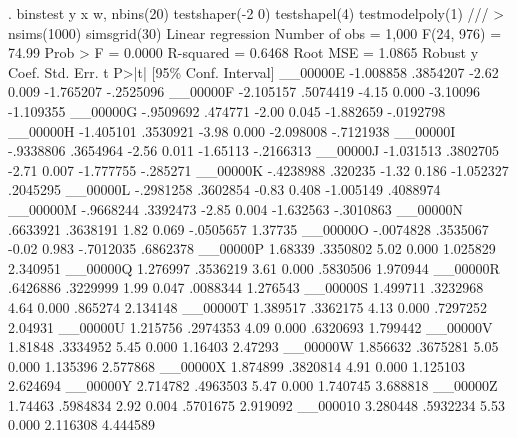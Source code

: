 . binstest y x w, nbins(20) testshaper(-2 0) testshapel(4) testmodelpoly(1) ///
>                    nsims(1000) simsgrid(30)
{\smallskip}
Linear regression                               Number of obs     =      1,000
                                                F(24, 976)        =      74.99
                                                Prob > F          =     0.0000
                                                R-squared         =     0.6468
                                                Root MSE          =     1.0865
{\smallskip}
             {\VBAR}               Robust
           y {\VBAR}      Coef.   Std. Err.      t    P>|t|     [95\% Conf. Interval]
    __00000E {\VBAR}  -1.008858   .3854207    -2.62   0.009    -1.765207   -.2525096
    __00000F {\VBAR}  -2.105157   .5074419    -4.15   0.000     -3.10096   -1.109355
    __00000G {\VBAR}  -.9509692    .474771    -2.00   0.045    -1.882659   -.0192798
    __00000H {\VBAR}  -1.405101   .3530921    -3.98   0.000    -2.098008   -.7121938
    __00000I {\VBAR}  -.9338806   .3654964    -2.56   0.011     -1.65113   -.2166313
    __00000J {\VBAR}  -1.031513   .3802705    -2.71   0.007    -1.777755    -.285271
    __00000K {\VBAR}  -.4238988    .320235    -1.32   0.186    -1.052327    .2045295
    __00000L {\VBAR}  -.2981258   .3602854    -0.83   0.408    -1.005149    .4088974
    __00000M {\VBAR}  -.9668244   .3392473    -2.85   0.004    -1.632563   -.3010863
    __00000N {\VBAR}   .6633921   .3638191     1.82   0.069    -.0505657     1.37735
    __00000O {\VBAR}  -.0074828   .3535067    -0.02   0.983    -.7012035    .6862378
    __00000P {\VBAR}    1.68339   .3350802     5.02   0.000     1.025829    2.340951
    __00000Q {\VBAR}   1.276997   .3536219     3.61   0.000     .5830506    1.970944
    __00000R {\VBAR}   .6426886   .3229999     1.99   0.047     .0088344    1.276543
    __00000S {\VBAR}   1.499711   .3232968     4.64   0.000      .865274    2.134148
    __00000T {\VBAR}   1.389517   .3362175     4.13   0.000     .7297252     2.04931
    __00000U {\VBAR}   1.215756   .2974353     4.09   0.000     .6320693    1.799442
    __00000V {\VBAR}    1.81848   .3334952     5.45   0.000      1.16403     2.47293
    __00000W {\VBAR}   1.856632   .3675281     5.05   0.000     1.135396    2.577868
    __00000X {\VBAR}   1.874899   .3820814     4.91   0.000     1.125103    2.624694
    __00000Y {\VBAR}   2.714782   .4963503     5.47   0.000     1.740745    3.688818
    __00000Z {\VBAR}    1.74463   .5984834     2.92   0.004     .5701675    2.919092
    __000010 {\VBAR}   3.280448   .5932234     5.53   0.000     2.116308    4.444589
